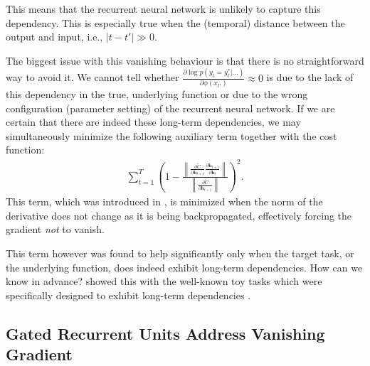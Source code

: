 \documentclass{report}
\newcommand{\vect}[1]{\mathbf{#1}}
\newcommand{\vh}[0]{\vect{h}}
\begin{document}
This means that the recurrent neural network is unlikely to capture this
dependency. This is especially true when the (temporal) distance between the
output and input, i.e., $|t - t'| \gg 0$.

The biggest issue with this vanishing behaviour is that there is no
straightforward way to avoid it. We cannot tell whether $\frac{\partial \log
p(y_t=y_t^*|\ldots)}{\partial \phi(x_{t'})} \approx 0$ is due to the lack of
this dependency in the true, underlying function or due to the wrong
configuration (parameter setting) of the recurrent neural network. If we are
certain that there are indeed these long-term dependencies, we may
simultaneously minimize the following auxiliary term together with the cost
function:
\begin{align*}
    \sum_{t=1}^T \left( 1 - \frac{\left\| 
            \frac{\partial \tilde{C}}{\partial \vh_{t+1}}
            \frac{\partial \vh_{t+1}}{\partial \vh_t}
    \right\|}{\left\| 
        \frac{\partial \tilde{C}}{\partial \vh_{t+1}}
\right\|} \right)^2.
\end{align*}
This term, which was introduced in \citet{pascanu2013difficulty}, is minimized
when the norm of the derivative does not change as it is being backpropagated,
effectively forcing the gradient {\em not} to vanish.

This term however was found to help significantly only when the target task, or
the underlying function, does indeed exhibit long-term dependencies. How can we
know in advance? \citet{pascanu2013difficulty} showed this with
the well-known toy tasks which were specifically designed to exhibit long-term
dependencies \citep{hochreiter2001gradient}.


\subsection{Gated Recurrent Units Address Vanishing Gradient}
\end{document}
